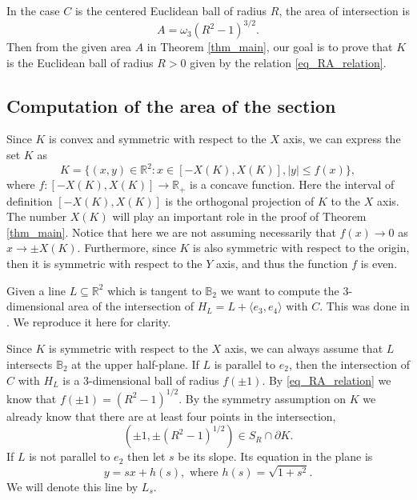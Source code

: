 \documentclass{amsart}
\def \R{\mathbb R}
\def \B{\mathbb B}
\begin{document}
In the case $C$ is the centered Euclidean ball of radius $R$, the area of intersection is 
\begin{equation}
	\label{eq_RA_relation}
	A = \omega_3 (R^2 - 1)^{3/2}.
\end{equation}
Then from the given area $A$ in Theorem \ref{thm_main}, our goal is to prove that $K$ is the Euclidean ball of radius $R>0$ given by the relation \eqref{eq_RA_relation}.

\subsection{Computation of the area of the section}
Since $K$ is convex and symmetric with respect to the $X$ axis, we can express the set $K$ as
\begin{equation}
	\label{eq_Ksubgrapf}
	K = \{(x,y) \in \R^2 : x \in [-X(K), X(K)], |y| \leq f(x)\},
\end{equation}
where $f:[-X(K),X(K)] \to \R_+$ is a concave function.
Here the interval of definition $[-X(K),X(K)]$ is the orthogonal projection of $K$ to the $X$ axis.
The number $X(K)$ will play an important role in the proof of Theorem \ref{thm_main}.
Notice that here we are not assuming necessarily that $f(x) \to 0$ as $x \to \pm X(K)$.
Furthermore, since $K$ is also symmetric with respect to the origin, then it is symmetric with respect to the $Y$ axis, and thus the function $f$ is even.

Given a line $L \subseteq \R^2$ which is tangent to $\B_2$ we want to compute the $3$-dimensional area of the intersection of $H_L = L + \langle e_3, e_4 \rangle$ with $C$.
This was done in \cite[Lemma 4.2]{alfonseca2025croft}. We reproduce it here for clarity.

Since $K$ is symmetric with respect to the $X$ axis, we can always assume that $L$ intersects $\B_2$ at the upper half-plane.
If $L$ is parallel to $e_2$, then the intersection of $C$ with $H_L$ is a $3$-dimensional ball of radius $f(\pm 1)$.
By \eqref{eq_RA_relation} we know that $f(\pm 1) = (R^2-1)^{1/2}$. 
By the symmetry assumption on $K$ we already know that there are at least four points in the intersection,
\[ \left(\pm 1, \pm \left(R^2-1\right)^{1/2} \right) \in S_R \cap \partial K.\]
If $L$ is not parallel to $e_2$ then let $s$ be its slope. Its equation in the plane is 
\begin{equation}
	\label{eq_line}
	y = s x + h(s), \text{ where } h(s) = \sqrt{1+s^2}.
\end{equation}
We will denote this line by $L_s$.
\end{document}
